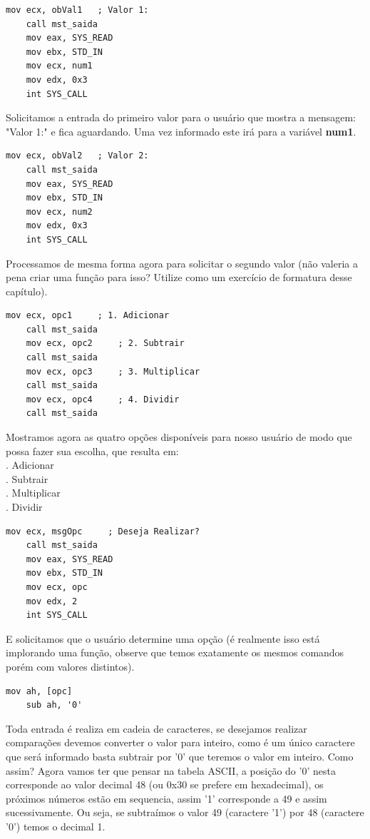 \begin{lstlisting}[]
	mov ecx, obVal1   ; Valor 1:
	call mst_saida
	mov eax, SYS_READ
	mov ebx, STD_IN
	mov ecx, num1
	mov edx, 0x3
	int SYS_CALL	
\end{lstlisting}

Solicitamos a entrada do primeiro valor para o usuário que mostra a mensagem: "Valor 1:" e fica aguardando. Uma vez informado este irá para a variável \textbf{num1}.

\begin{lstlisting}[]
	mov ecx, obVal2   ; Valor 2:
	call mst_saida
	mov eax, SYS_READ
	mov ebx, STD_IN
	mov ecx, num2
	mov edx, 0x3
	int SYS_CALL
\end{lstlisting}

Processamos de mesma forma agora para solicitar o segundo valor (não valeria a pena criar uma função para isso? Utilize como um exercício de formatura desse capítulo).

\begin{lstlisting}[]
	mov ecx, opc1     ; 1. Adicionar
	call mst_saida
	mov ecx, opc2     ; 2. Subtrair
	call mst_saida
	mov ecx, opc3     ; 3. Multiplicar
	call mst_saida
	mov ecx, opc4     ; 4. Dividir
	call mst_saida
\end{lstlisting}

Mostramos agora as quatro opções disponíveis para nosso usuário de modo que possa fazer sua escolha, que resulta em: \\
{. Adicionar} \\
{. Subtrair} \\
{. Multiplicar} \\
{. Dividir}

\begin{lstlisting}[]
	mov ecx, msgOpc     ; Deseja Realizar?
	call mst_saida
	mov eax, SYS_READ
	mov ebx, STD_IN
	mov ecx, opc
	mov edx, 2
	int SYS_CALL
\end{lstlisting}

E solicitamos que o usuário determine uma opção (é realmente isso está implorando uma função, observe que temos exatamente os mesmos comandos porém com valores distintos).

\begin{lstlisting}[]
	mov ah, [opc]
	sub ah, '0'
\end{lstlisting}

Toda entrada é realiza em cadeia de caracteres, se desejamos realizar comparações devemos converter o valor para inteiro, como é um único caractere que será informado basta subtrair por '0' que teremos o valor em inteiro. Como assim? Agora vamos ter que pensar na tabela ASCII, a posição do '0' nesta corresponde ao valor decimal 48 (ou 0x30 se prefere em hexadecimal), os próximos números estão em sequencia, assim '1' corresponde a 49 e assim sucessivamente. Ou seja, se subtraímos o valor 49 (caractere '1') por 48 (caractere '0') temos o decimal 1.

